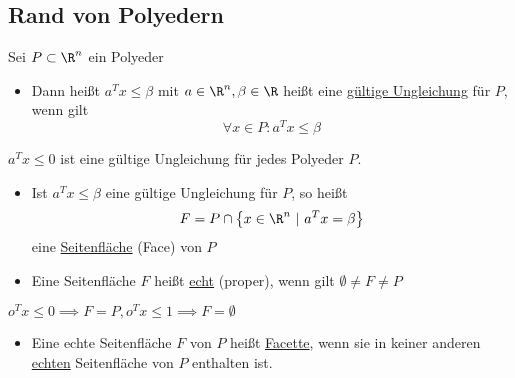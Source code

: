 \subsection{Rand von Polyedern}
\begin{definition}
	Sei $P \subset \R^n$ ein Polyeder
	\begin{itemize}
		\item Dann heißt $a^{T} x \leq \beta$ mit $a \in \R^n, \beta \in \R$ heißt eine \underline{gültige Ungleichung} für $P$, wenn gilt
			 \begin{equation*}
				\forall x \in P: a^{T} x \leq \beta
			\end{equation*}
	\end{itemize}
\end{definition}
\begin{beispiel}
	$a^{T} x \leq 0$ ist eine gültige Ungleichung für jedes Polyeder $P$.
	 \begin{itemize}
		\item Ist $a^{T} x \leq \beta$ eine gültige Ungleichung für $P$, so heißt
			\begin{equation*}
				F = P \cap \left\{ x \in \R^n\ |\ a^{T} x = \beta \right\}
			\end{equation*}
			eine \underline{Seitenfläche} (Face) von $P$
		\item Eine Seitenfläche $F$ heißt \underline{echt} (proper), wenn gilt $\emptyset \neq F \neq P$
	\end{itemize}
\end{beispiel}
\begin{beispiel}
	$o^{T} x \leq 0 \implies F = P, o^{T} x \leq 1 \implies F = \emptyset$
	\begin{itemize}
		\item Eine echte Seitenfläche $F$ von $P$ heißt \underline{Facette}, wenn sie in keiner anderen \underline{echten} Seitenfläche von  $P$ enthalten ist.
	\end{itemize}
\end{beispiel}

